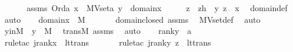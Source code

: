 \begin{isabellebody}
%
\isadelimproof
%
\endisadelimproof
%
\isatagproof
{}\isamarkupfalse%
\ {\isacharminus}{\kern0pt}\ \isanewline
\ \ \isamarkupfalse%
\ assms{\isacharcolon}{\kern0pt}\ {\isachardoublequoteopen}Ord{\isacharparenleft}{\kern0pt}a{\isacharparenright}{\kern0pt}{\isachardoublequoteclose}\ {\isachardoublequoteopen}x\ {\isasymin}\ MVset{\isacharparenleft}{\kern0pt}a{\isacharparenright}{\kern0pt}{\isachardoublequoteclose}\ {\isachardoublequoteopen}y\ {\isasymin}\ domain{\isacharparenleft}{\kern0pt}x{\isacharparenright}{\kern0pt}{\isachardoublequoteclose}\isanewline
\ \ \isamarkupfalse%
\ \isamarkupfalse%
\ z\ \ zh\ {\isacharcolon}{\kern0pt}\ {\isachardoublequoteopen}{\isacharless}{\kern0pt}y{\isacharcomma}{\kern0pt}\ z{\isachargreater}{\kern0pt}\ {\isasymin}\ x{\isachardoublequoteclose}\ \isamarkupfalse%
\ domain{\isacharunderscore}{\kern0pt}def\ \isamarkupfalse%
\ auto\isanewline
\ \ \isamarkupfalse%
\ {\isachardoublequoteopen}domain{\isacharparenleft}{\kern0pt}x{\isacharparenright}{\kern0pt}\ {\isasymin}\ M{\isachardoublequoteclose}\ \isanewline
\ \ \ \ \isamarkupfalse%
\ domain{\isacharunderscore}{\kern0pt}closed\ assms\ \isamarkupfalse%
\ MVset{\isacharunderscore}{\kern0pt}def\ \isamarkupfalse%
\ auto\ \isanewline
\ \ \isamarkupfalse%
\ \isamarkupfalse%
\ yinM\ {\isacharcolon}{\kern0pt}\ {\isachardoublequoteopen}y\ {\isasymin}\ M{\isachardoublequoteclose}\ \isamarkupfalse%
\ transM\ assms\ \isamarkupfalse%
\ auto\isanewline
\ \ \isamarkupfalse%
\ {\isachardoublequoteopen}rank{\isacharparenleft}{\kern0pt}y{\isacharparenright}{\kern0pt}\ {\isacharless}{\kern0pt}\ a{\isachardoublequoteclose}\ \isanewline
\ \ \ \ \isamarkupfalse%
\ {\isacharparenleft}{\kern0pt}rule{\isacharunderscore}{\kern0pt}tac\ j{\isacharequal}{\kern0pt}{\isachardoublequoteopen}rank{\isacharparenleft}{\kern0pt}x{\isacharparenright}{\kern0pt}{\isachardoublequoteclose}\ \ lt{\isacharunderscore}{\kern0pt}trans{\isacharparenright}{\kern0pt}\ \isanewline
\ \ \ \ \isamarkupfalse%
\ {\isacharparenleft}{\kern0pt}rule{\isacharunderscore}{\kern0pt}tac\ j{\isacharequal}{\kern0pt}{\isachardoublequoteopen}rank{\isacharparenleft}{\kern0pt}{\isacharless}{\kern0pt}y{\isacharcomma}{\kern0pt}\ z{\isachargreater}{\kern0pt}{\isacharparenright}{\kern0pt}{\isachardoublequoteclose}\ \ lt{\isacharunderscore}{\kern0pt}trans{\isacharparenright}{\kern0pt}\ \isanewline

\end{isabellebody}
